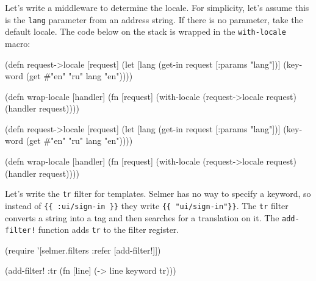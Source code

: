 
\fi

Let's write a middleware to determine the locale.
For simplicity, let's assume this is the \verb|lang| parameter from an address string.
If there is no parameter, take the default locale.
The code below on the stack is wrapped in the \verb|with-locale| macro:

\ifx\DEVICETYPE\MOBILE

\begin{english}
  \begin{clojure}
(defn request->locale [request]
  (let [lang (get-in request
               [:params "lang"])]
    (keyword
      (get #{"en" "ru"} lang "en"))))

(defn wrap-locale [handler]
  (fn [request]
    (with-locale
      (request->locale request)
      (handler request))))
  \end{clojure}
\end{english}

\else

\begin{english}
  \begin{clojure}
(defn request->locale [request]
  (let [lang (get-in request [:params "lang"])]
    (keyword (get #{"en" "ru"} lang "en"))))

(defn wrap-locale [handler]
  (fn [request]
    (with-locale (request->locale request)
      (handler request))))
  \end{clojure}
\end{english}

\fi

Let's write the \verb|tr| filter for templates.
Selmer has no way to specify a keyword, so instead of \verb|{{ :ui/sign-in }}| they write \verb|{{ "ui/sign-in"}}|.
The \verb|tr| filter converts a string into a tag and then searches for a translation on it. The \verb|add-filter!| function adds \verb|tr| to the filter register.

\ifx\DEVICETYPE\MOBILE

\begin{english}
  \begin{clojure}
(require
 '[selmer.filters :refer [add-filter!]])

(add-filter! :tr
 (fn [line]
   (-> line keyword tr)))
  \end{clojure}
\end{english}

\else

